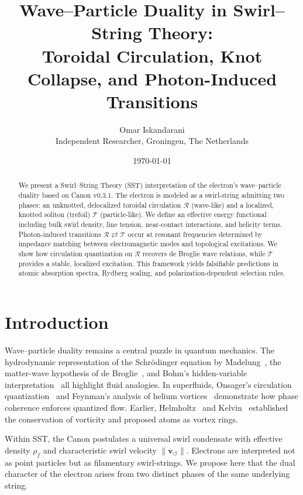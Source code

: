\documentclass[11pt,a4paper]{article}
\title{Wave--Particle Duality in Swirl--String Theory: \\
Toroidal Circulation, Knot Collapse, and Photon-Induced Transitions}
\author{Omar Iskandarani \\ Independent Researcher, Groningen, The Netherlands}
\date{\today}
\newcommand{\rhof}{\rho_{\!f}}                           %
\begin{document}
\maketitle

\begin{abstract}
    We present a Swirl--String Theory (SST) interpretation of the electron’s wave--particle duality based on Canon v0.3.1. The electron is modeled as a swirl-string admitting two phases: an unknotted, delocalized toroidal circulation $\mathcal{R}$ (wave-like) and a localized, knotted soliton (trefoil) $\mathcal{T}$ (particle-like). We define an effective energy functional including bulk swirl density, line tension, near-contact interactions, and helicity terms. Photon-induced transitions $\mathcal{R} \rightleftarrows \mathcal{T}$ occur at resonant frequencies determined by impedance matching between electromagnetic modes and topological excitations. We show how circulation quantization on $\mathcal{R}$ recovers de Broglie wave relations, while $\mathcal{T}$ provides a stable, localized excitation. This framework yields falsifiable predictions in atomic absorption spectra, Rydberg scaling, and polarization-dependent selection rules.
\end{abstract}

\section{Introduction}

    Wave--particle duality remains a central puzzle in quantum mechanics. The hydrodynamic representation of the Schrödinger equation by Madelung~\cite{Madelung1927}, the matter-wave hypothesis of de Broglie~\cite{deBroglie1925}, and Bohm’s hidden-variable interpretation~\cite{Bohm1952a,Bohm1952b} all highlight fluid analogies. In superfluids, Onsager’s circulation quantization~\cite{Onsager1949} and Feynman’s analysis of helium vortices~\cite{Feynman1955} demonstrate how phase coherence enforces quantized flow. Earlier, Helmholtz~\cite{Helmholtz1858} and Kelvin~\cite{Kelvin1869} established the conservation of vorticity and proposed atoms as vortex rings.

    Within SST, the Canon postulates a universal swirl condensate with effective density $\rhof$ and characteristic swirl velocity $\|\mathbf{v}_{\circlearrowleft}\|$. Electrons are interpreted not as point particles but as filamentary swirl-strings. We propose here that the dual character of the electron arises from two distinct phases of the same underlying string.
\end{document}
